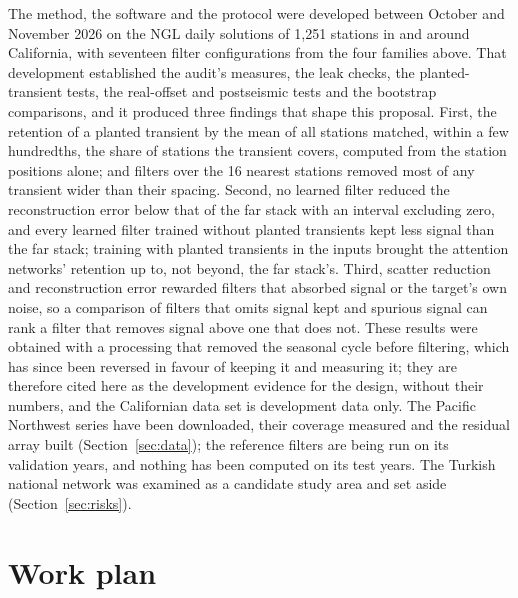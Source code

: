 \documentclass[preprint,12pt,authoryear]{elsarticle}
\begin{document}
The method, the software and the protocol were developed between October and November 2026 on the NGL daily solutions of 1,251 stations in and around California, with seventeen filter configurations from the four families above. That development established the audit's measures, the leak checks, the planted-transient tests, the real-offset and postseismic tests and the bootstrap comparisons, and it produced three findings that shape this proposal. First, the retention of a planted transient by the mean of all stations matched, within a few hundredths, the share of stations the transient covers, computed from the station positions alone; and filters over the 16 nearest stations removed most of any transient wider than their spacing. Second, no learned filter reduced the reconstruction error below that of the far stack with an interval excluding zero, and every learned filter trained without planted transients kept less signal than the far stack; training with planted transients in the inputs brought the attention networks' retention up to, not beyond, the far stack's. Third, scatter reduction and reconstruction error rewarded filters that absorbed signal or the target's own noise, so a comparison of filters that omits signal kept and spurious signal can rank a filter that removes signal above one that does not. These results were obtained with a processing that removed the seasonal cycle before filtering, which has since been reversed in favour of keeping it and measuring it; they are therefore cited here as the development evidence for the design, without their numbers, and the Californian data set is development data only. The Pacific Northwest series have been downloaded, their coverage measured and the residual array built (Section~\ref{sec:data}); the reference filters are being run on its validation years, and nothing has been computed on its test years. The Turkish national network was examined as a candidate study area and set aside (Section~\ref{sec:risks}).

\section{Work plan}
\label{sec:workplan}
\end{document}
